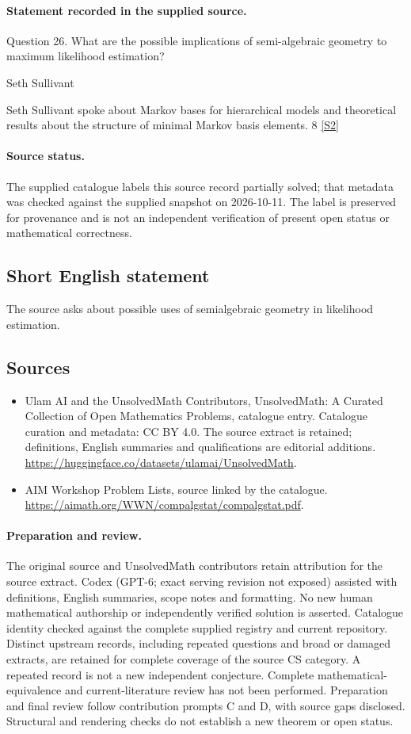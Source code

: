 \documentclass[11pt]{article}
\begin{document}
\paragraph{Statement recorded in the supplied source.}
Question 26. What are the possible implications of semi-algebraic geometry to maximum likelihood estimation?

Seth Sullivant

Seth Sullivant spoke about Markov bases for hierarchical models and theoretical results about the structure of minimal Markov basis elements. 8 \href{https://aimath.org/WWN/compalgstat/compalgstat.pdf}{[S2]}
\paragraph{Source status.}
The supplied catalogue labels this source record partially solved; that metadata was checked against the supplied snapshot on 2026-10-11. The label is preserved for provenance and is not an independent verification of present open status or mathematical correctness.
\subsection{Short English statement}
The source asks about possible uses of semialgebraic geometry in likelihood estimation.
\subsection{Sources}
\begin{itemize}
\item[S1] Ulam AI and the UnsolvedMath Contributors, UnsolvedMath: A Curated Collection of Open Mathematics Problems, catalogue entry. Catalogue curation and metadata: CC BY 4.0. The source extract is retained; definitions, English summaries and qualifications are editorial additions.
\url{https://huggingface.co/datasets/ulamai/UnsolvedMath}.
\item[S2] AIM Workshop Problem Lists, source linked by the catalogue.
\url{https://aimath.org/WWN/compalgstat/compalgstat.pdf}.
\end{itemize}
\paragraph{Preparation and review.}
The original source and UnsolvedMath contributors retain attribution for the source extract. Codex (GPT-6; exact serving revision not exposed) assisted with definitions, English summaries, scope notes and formatting. No new human mathematical authorship or independently verified solution is asserted. Catalogue identity checked against the complete supplied registry and current repository. Distinct upstream records, including repeated questions and broad or damaged extracts, are retained for complete coverage of the source CS category. A repeated record is not a new independent conjecture. Complete mathematical-equivalence and current-literature review has not been performed. Preparation and final review follow contribution prompts C and D, with source gaps disclosed. Structural and rendering checks do not establish a new theorem or open status.
\label{end:statement}
\end{document}
